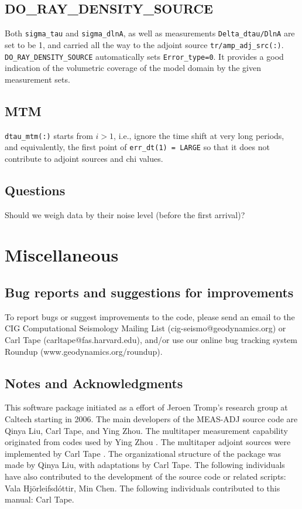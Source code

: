 \documentclass[11pt,titlepage,fleqn]{article}
\newcommand{\vala}{Hj\"{o}rleifsd\'{o}ttir}
\begin{document}
\subsection{DO\_RAY\_DENSITY\_SOURCE}
Both \verb+sigma_tau+ and \verb+sigma_dlnA+, as well as measurements \verb+Delta_dtau/DlnA+ are set to be 1,
and carried all the way to the adjoint source \verb+tr/amp_adj_src(:)+. \verb+DO_RAY_DENSITY_SOURCE+ automatically
sets \verb+Error_type=0+. It provides a good indication of the volumetric coverage of the model domain by the
given measurement sets.

\subsection{MTM}
\verb+dtau_mtm(:)+ starts from $i > 1$, i.e., ignore the time shift at very long periods, and equivalently,
the first point of \verb+err_dt(1) = LARGE+ so that it does not contribute to adjoint sources and chi values.

\subsection{Questions}
Should we weigh data by their noise level (before the first arrival)?

\pagebreak
\section{Miscellaneous}

\subsection{Bug reports and suggestions for improvements}

To report bugs or suggest improvements to the code, please send an email to the CIG Computational Seismology Mailing List (cig-seismo@geodynamics.org) or Carl Tape (carltape@fas.harvard.edu), and/or use our online bug tracking system Roundup (www.geodynamics.org/roundup).


\subsection{Notes and Acknowledgments}

This software package initiated as a effort of Jeroen Tromp's research group at Caltech starting in 2006.
The main developers of the MEAS-ADJ source code are Qinya Liu, Carl Tape, and Ying Zhou.
The multitaper measurement capability originated from codes used by Ying Zhou \citep[][]{YZhou2004,YZhou2005}.
The multitaper adjoint sources were implemented by Carl Tape \citep[][Appendix~C]{Tape2009phd}.
The organizational structure of the package was made by Qinya Liu, with adaptations by Carl Tape.
The following individuals have also contributed to the development of the source code or related scripts: Vala \vala, Min Chen.
The following individuals contributed to this manual: Carl Tape.
\end{document}

